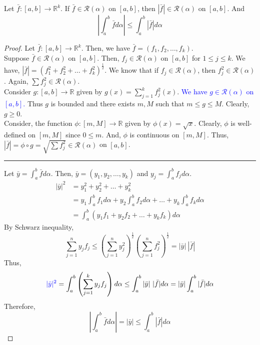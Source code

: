 \begin{theorem}
	Let $\bar{f} : [a,b] \to \mathbb{R}^k$.
	If $\bar{f} \in \mathscr{R}(\alpha)$ on $[a,b]$, then $|\bar{f}| \in \mathscr{R}(\alpha)$ on $[a,b]$.
	And
	\[ \left| \int_a^b \bar{f} d\alpha \right| \le \int_a^b |\bar{f}| d\alpha \]
\end{theorem}
\begin{proof}
	Let $\bar{f} : [a,b] \to \mathbb{R}^k$.
	Then, we have $\bar{f} = (f_1,f_2,\dots,f_k)$.\\
	Suppose $\bar{f} \in \mathscr{R}(\alpha)$ on $[a,b]$.
	Then, $f_j \in \mathscr{R}(\alpha)$ on $[a,b]$ for $1 \le j \le k$.
	We have, $|\bar{f}| = \left( f_1^2+f_2^2+\dots+f_k^2 \right)^\frac{1}{2}$.
	We know that if $f_j \in \mathscr{R}(\alpha)$, then $f_j^2 \in \mathscr{R}(\alpha)$.
	Again, $\sum f_j^2 \in \mathscr{R}(\alpha)$.\\

	Consider $g : [a,b] \to \mathbb{R}$ given by $g(x) = \sum_{j=1}^k f_j^2(x)$.
	\textcolor{blue}{We have $g \in \mathscr{R}(\alpha)$ on $[a,b]$.}
	Thus $g$ is bounded and there exists $m,M$ such that $m \le g \le M$.
	Clearly, $g \ge 0$.\\

	Consider, the function $\phi : [m,M] \to \mathbb{R}$ given by $\phi(x) = \sqrt{x}$.
	Clearly, $\phi$ is well-defined on $[m,M]$ since $0 \le m$.
	And, $\phi$ is continuous on $[m,M]$.
	Thus, $|\bar{f}| = \phi \circ g = \sqrt{\sum f_j^2} \in \mathscr{R}(\alpha)$ on $[a,b]$.\\

	\hrule \vspace{1em}
	
	Let $\displaystyle \bar{y} = \int_a^b \bar{f} d\alpha$.
	Then, $\bar{y} = (y_1,y_2,\dots,y_k)$ and $\displaystyle y_j = \int_a^b f_j d\alpha$.
	\begin{align*}
	|\bar{y}|^2 
		& = y_1^2 + y_2^2 + \dots + y_k^2\\
		& = y_1 \int_a^b f_1 d\alpha + y_2 \int_a^b f_2 d\alpha + \dots + y_k \int_a^b f_k d\alpha \\
		& = \int_a^b (y_1f_1 + y_2f_2 + \dots + y_kf_k) d\alpha
	\end{align*}
	By Schwarz inequality,
		\[ \sum_{j=1}^n y_j f_j \le \left( \sum_{j=1}^n y_j^2 \right)^\frac{1}{2} \left( \sum_{j=1}^n f_j^2 \right)^\frac{1}{2} = |\bar{y}| \ |\bar{f}| \]
	Thus,
		\[ {\color{blue}|\bar{y}|^2} = \int_a^b \left( \sum_{j=1}^k y_jf_j \right) d\alpha \le \int_a^b |\bar{y}|\ |\bar{f}| d\alpha = |\bar{y}| \int_a^b |\bar{f}| d\alpha \]
	Therefore,
		\[ \left| \int_a^b \bar{f} d\alpha \right| = |\bar{y}| \le \int_a^b |\bar{f}| d\alpha \]

\end{proof}

